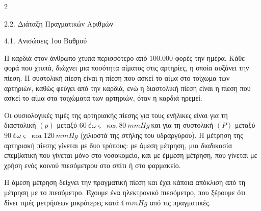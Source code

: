 \begin{ylh}{2}
    \item 2.2. Διάταξη Πραγματικών Αριθμών
    \item 4.1. Ανισώσεις 1ου Βαθμού
\end{ylh}
Η καρδιά στον άνθρωπο χτυπά περισσότερο από $100.000$ φορές την ημέρα. Κάθε φορά που χτυπά, διώχνει μια ποσότητα αίματος στις αρτηρίες, η οποία αυξάνει την πίεση. Η συστολική πίεση είναι η πίεση που ασκεί το αίμα στο τοίχωμα των αρτηριών, καθώς φεύγει από την καρδιά, ενώ η διαστολική πίεση είναι η πίεση που ασκεί το αίμα στα τοιχώματα των αρτηριών, όταν η καρδιά ηρεμεί.

Οι φυσιολογικές τιμές της αρτηριακής πίεσης για τους ενήλικες είναι για τη διαστολική $(p)$ μεταξύ $60\ έ\omega\varsigma\ \text{ και}\ 80\ mmHg\ $και για τη συστολική $(P)$ μεταξύ $90\ έ\omega\varsigma\ \text{ και}\ 120\ mmHg$ (χιλιοστά της στήλης του υδραργύρου). Η μέτρηση της αρτηριακή πίεσης γίνεται με δυο τρόπους: με άμεση μέτρηση, μια διαδικασία επεμβατική που γίνεται μόνο στο νοσοκομείο, και με έμμεση μέτρηση, που γίνεται με χρήση ενός κοινού πιεσόμετρου στο σπίτι ή στο φαρμακείο.

Η άμεση μέτρηση δείχνει την πραγματική πίεση και έχει κάποια απόκλιση από τη μέτρηση με το πιεσόμετρο. Έχουμε ένα ηλεκτρονικό πιεσόμετρο, που ξέρουμε ότι δίνει τιμές μετρήσεων μικρότερες κατά$\ 4\ mmHg$ από τις πραγματικές.

